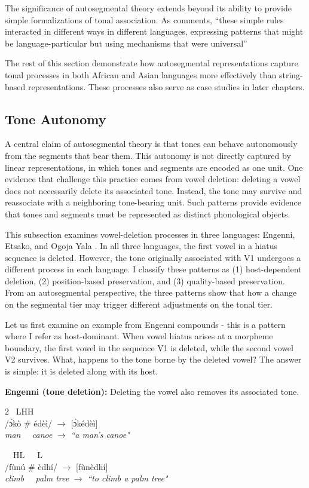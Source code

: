 The significance of autosegmental theory extends beyond its ability to
provide simple formalizations of tonal association. As
\citet{leben2018history} comments, ``these simple rules interacted in
different ways in different languages, expressing patterns that might be
language-particular but using mechanisms that were universal''

The rest of this section demonstrate how autosegmental representations
capture tonal processes in both African and Asian languages more effectively
than string-based representations. These processes also serve as case studies
in later chapters.



\subsection{Tone Autonomy}
A central claim of autosegmental theory is that tones can behave
autonomously from the segments that bear them. This autonomy is not
directly captured by linear representations, in which tones and segments
are encoded as one unit. One evidence that challenge this practice comes
from vowel deletion: deleting a vowel does not necessarily delete its
associated tone. Instead, the tone may survive and reassociate with a
neighboring tone-bearing unit. Such patterns provide evidence that tones
and segments must be represented as distinct phonological objects.

This subsection examines vowel-deletion processes in three languages:
Engenni, Etsako, and Ogoja Yala \citep{kao2017phonological}. In all three
languages, the first vowel in a hiatus sequence is deleted.
However, the tone originally associated with V1 undergoes a 
different process in each language. I classify these
patterns as (1) host-dependent deletion, (2)
{position-based preservation}, and (3) {quality-based 
preservation}. From an autosegmental perspective, the three patterns show that how a change
on the segmental tier may trigger different adjustments on the tonal tier.

Let us first examine an example from Engenni compounds - this is a 
pattern where I refer as host-dominant. When vowel
hiatus arises at a morpheme boundary, the first vowel in the sequence
V1 is deleted, while the second vowel V2 survives. What,
happens to the tone borne by the deleted vowel? The answer is
simple: it is deleted along with its host.

\ex 
\textbf{Engenni (tone deletion):} 
Deleting the vowel also removes its associated tone.
\begin{multicols}{2}
\quad\ L\quad H\qquad\qquad H\\
 /\` ɔkò \# édèì/ $\rightarrow$ [\` ɔkédèì] \\
 \textit{man \ \ canoe} $\rightarrow$ \textit{``a man’s canoe"} 
 
 \quad\ \ H\quad L\qquad\qquad\ \ \ L\\
/fùnú \# èdhí/ $\rightarrow$ [fùnèdhí] \\
\textit{climb \ \ palm tree} $\rightarrow$ \textit{``to climb a palm tree"}
\end{multicols}
\xe



